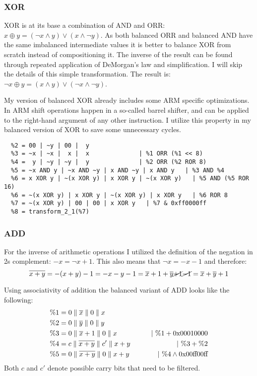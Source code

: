 \subsubsection{XOR}
XOR is at its base a combination of AND and ORR: $x \oplus y = (\neg{x} \land y) \lor (x \land \neg{y})$.
As both balanced ORR and balanced AND have the same imbalanced intermediate values it is better to balance XOR from scratch instead of compositioning it.
The inverse of the result can be found through repeated application of DeMorgan's law and simplification.
I will skip the details of this simple transformation.
The result is: $\neg{x \oplus y} = (x \land y) \lor (\neg{x} \land \neg{y})$.

My version of balanced XOR already includes some ARM specific optimizations.
In ARM shift operations happen in a so-called barrel shifter, and can be applied to the right-hand argument of any other instruction.
I utilize this property in my balanced version of XOR to save some unnecessary cycles.

\begin{lstlisting}[caption=Balanced XOR, label=lst:xor]
  %1 = 00 | ~x | 00 |  x
  %2 = 00 | ~y | 00 |  y
  %3 = ~x | ~x |  x |  x              | %1 ORR (%1 << 8)
  %4 =  y | ~y | ~y |  y              | %2 ORR (%2 ROR 8)
  %5 = ~x AND y | ~x AND ~y | x AND ~y | x AND y   | %3 AND %4
  %6 = x XOR y | ~(x XOR y) | x XOR y | ~(x XOR y)   | %5 AND (%5 ROR 16)
  %6 = ~(x XOR y) | x XOR y | ~(x XOR y) | x XOR y   | %6 ROR 8
  %7 = ~(x XOR y) | 00 | 00 | x XOR y   | %7 & 0xff0000ff
  %8 = transform_2_1(%7)
\end{lstlisting}

\subsubsection{ADD}
For the inverse of arithmetic operations I utilized the definition of the negation in 2s complement: $-x = \neg{x} + 1$.
This also means that $\neg{x} = -x - 1$ and therefore:
\begin{equation*}
  \neg{x + y} = - (x + y) - 1 = - x - y - 1 = \neg{x} + 1 + \neg{y} \cancel{+ 1} \cancel{- 1} = \neg{x} + \neg{y} + 1
\end{equation*}

Using associativity of addition the balanced variant of ADD looks like the following:
\begin{align*}
  \%1 &= 0 \bsep \neg{x} \bsep 0 \bsep x &\\
  \%2 &= 0 \bsep \neg{y} \bsep 0 \bsep y &\\
  \%3 &= 0 \bsep \neg{x}+1 \bsep 0 \bsep x &\qquad |\ \%1 + \hex{00010000}\\
  \%4 &= c \bsep \neg{x+y} \bsep c' \bsep x+y &\qquad |\ \%3 + \%2\\
  \%5 &= 0 \bsep \neg{x+y} \bsep 0 \bsep x+y &\qquad |\ \%4 \land \hex{00ff00ff}
\end{align*}
Both $c$ and $c'$ denote possible carry bits that need to be filtered.

